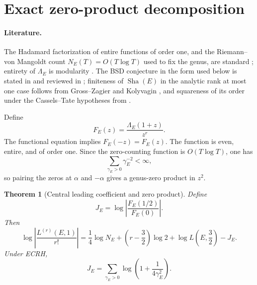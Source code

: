\documentclass[11pt,reqno]{amsart}
\newtheorem{theorem}{Theorem}
\theoremstyle{remark}
\newcommand{\ShaE}{\mathop{\mathrm{Sha}}}
\begin{document}
\section{Exact zero-product decomposition}
\label{sec:hadamard}

\paragraph{Literature.}
The Hadamard factorization of entire functions of order one, and the Riemann--von Mangoldt count $N_E(T)=O(T\log T)$ used to fix the genus, are standard \cite{IwaniecKowalski2004}; entirety of $\Lambda_E$ is modularity \cite{Wiles1995,BCDT2001}.  The BSD conjecture in the form used below is stated in \cite{BSD1965,Tate1966} and reviewed in \cite{Wiles2006}; finiteness of $\ShaE(E)$ in the analytic rank at most one case follows from Gross--Zagier \cite{GrossZagier1986} and Kolyvagin \cite{Kolyvagin1988}, and squareness of its order under the Cassels--Tate hypotheses from \cite{Cassels1965,PoonenStoll1999}.

Define
\begin{equation}
  F_E(z)=\frac{\Lambda_E(1+z)}{z^r}.
  \label{eq:F}
\end{equation}
The functional equation implies $F_E(-z)=F_E(z)$.  The function is even, entire, and of order one.  Since the zero-counting function is $O(T\log T)$, one has
\begin{equation}
  \sum_{\gamma_E>0}\gamma_E^{-2}<\infty,
\end{equation}
so pairing the zeros at $\alpha$ and $-\alpha$ gives a genus-zero product in $z^2$.

\begin{theorem}[Central leading coefficient and zero product]
Define
\begin{equation}
  J_E=\log\left|\frac{F_E(1/2)}{F_E(0)}\right|.
  \label{eq:J-unconditional}
\end{equation}
Then
\begin{equation}
  \boxed{
  \log\left|\frac{L^{(r)}(E,1)}{r!}\right|
  =\frac14\log N_E
   +\left(r-\frac32\right)\log2
   +\log L\!\left(E,\frac32\right)-J_E.
  }
  \label{eq:hadamard-identity}
\end{equation}
Under ECRH,
\begin{equation}
  \boxed{
  J_E=\sum_{\gamma_E>0}
  \log\!\left(1+\frac{1}{4\gamma_E^2}\right).
  }
  \label{eq:J-ECRH}
\end{equation}
\end{theorem}
\end{document}
